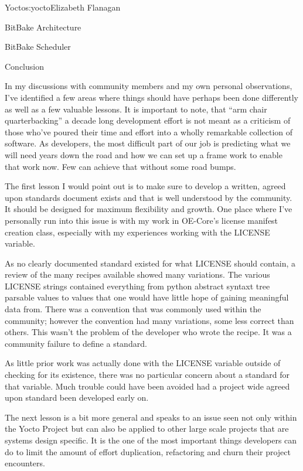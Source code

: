 \begin{aosachapter}{Yocto}{s:yocto}{Elizabeth Flanagan}
\begin{aosasect1}{BitBake Architecture}
\begin{aosasect2}{BitBake Scheduler}
\end{aosasect2}

\end{aosasect1}

\begin{aosasect1}{Conclusion}

In my discussions with community members and my own personal
observations, I've identified a few areas where things should have
perhaps been done differently as well as a few valuable lessons. It is
important to note, that ``arm chair quarterbacking'' a decade long
development effort is not meant as a criticism of those who've poured
their time and effort into a wholly remarkable collection of
software. As developers, the most difficult part of our job is
predicting what we will need years down the road and how we can set up
a frame work to enable that work now. Few can achieve that without
some road bumps.

The first lesson I would point out is to make sure to develop a
written, agreed upon standards document exists and that is well
understood by the community. It should be designed for maximum
flexibility and growth. One place where I've personally run into this
issue is with my work in OE-Core's license manifest creation class,
especially with my experiences working with the LICENSE variable.

As no clearly documented standard existed for what LICENSE should
contain, a review of the many recipes available showed many
variations. The various LICENSE strings contained everything from
python abstract syntaxt tree parsable values to values that one would
have little hope of gaining meaningful data from. There was a
convention that was commonly used within the community; however the
convention had many variations, some less correct than others. This
wasn't the problem of the developer who wrote the recipe. It was a
community failure to define a standard.

As little prior work was actually done with the LICENSE variable
outside of checking for its existence, there was no particular concern
about a standard for that variable. Much trouble could have been
avoided had a project wide agreed upon standard been developed early
on.

The next lesson is a bit more general and speaks to an issue seen not
only within the Yocto Project but can also be applied to other large
scale projects that are systems design specific. It is the one of the
most important things developers can do to limit the amount of effort
duplication, refactoring and churn their project encounters.


\end{aosasect1}
\end{aosachapter}
